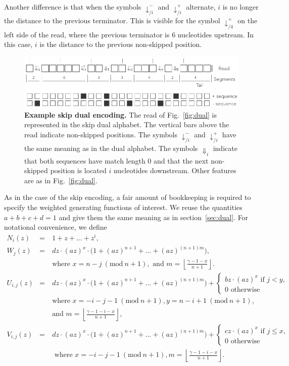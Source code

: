 \documentclass{article}
\newcommand{\modulo}[1]{\ (\mathrm{mod}\ #1)}
\begin{document}
Another difference is that when the symbols $\downarrow^-_{/i}$ and
$\downarrow^+_{/i}$ alternate, $i$ is no longer the distance to the
previous terminator. This is visible for the symbol $\downarrow^+_{/4}$ on
the left side of the read, where the previous terminator is 6 nucleotides
upstream. In this case, $i$ is the distance to the previous non-skipped
position.

\begin{figure}[h]
\centering
\includegraphics[scale=0.85]{sketch_skip_dual.pdf}
\caption{\textbf{Example skip dual encoding.}
The read of Fig.~\ref{fig:dual} is represented in the skip dual alphabet.
The vertical bars above the read indicate non-skipped positions. The
symbols $\downarrow_{/i}^-$ and $\downarrow_{/i}^+$ have the same meaning
as in the dual alphabet. The symbols $\Downarrow_i$ indicate that both
sequences have match length 0 and that the next non-skipped position is
located $i$ nucleotides downstream. Other features are as in
Fig.~\ref{fig:dual}.}
\label{fig:skip_dual}
\end{figure}

As in the case of the skip encoding, a fair amount of bookkeeping is
required to specify the weighted generating functions of interest.
We reuse the quantities $a+b+c+d=1$ and give them the same meaning as in
section~\ref{sec:dual}. For notational convenience, we define
\begin{eqnarray*}
N_i(z) &=& 1+z+\ldots+z^i, \\
W_j(z) &=& dz \cdot (az)^x \cdot \big( 1 + (az)^{n+1} + \ldots +
  (az)^{(n+1)m} \big), \\
  &\quad& \text{where } x = n-j \modulo{n+1},
  \text{ and } m = \left\lfloor
  \frac{\gamma-1-x}{n+1} \right\rfloor. \\
U_{i,j}(z) &=& dz \cdot (az)^x \cdot
  \big( 1 + (az)^{n+1} + \ldots + (az)^{(n+1)m} \big) +
\begin{cases}
  bz\cdot(az)^x \text{ if } j < y, \\
  0 \text{ otherwise}
\end{cases} \\
  &\quad& \text{where } x = -i-j-1 \modulo{n+1},
  y = n-i+1 \modulo{n+1}, \\
  &\quad& \text{and } m = \left\lfloor \frac{\gamma-1-i-x}{n+1}
    \right\rfloor, \\
V_{i,j}(z) &=& dz \cdot (az)^x \cdot
  \big( 1 + (az)^{n+1} + \ldots + (az)^{(n+1)m} \big) +
\begin{cases}
  cz\cdot(az)^x \text{ if } j \leq x, \\
  0 \text{ otherwise}
\end{cases} \\
  &\quad& \text{ where } x = -i-j-1 \modulo{n+1},
  m = \left\lfloor \frac{\gamma-1-i-x}{n+1} \right\rfloor.
\end{eqnarray*}
\end{document}
